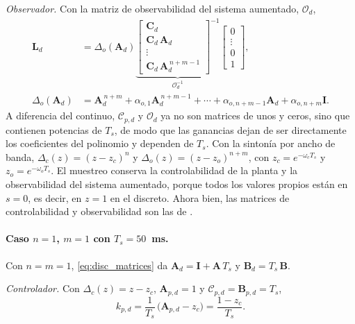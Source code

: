 \textit{Observador.} Con la matriz de observabilidad del sistema aumentado,
$\mathcal{O}_d$,
\begin{equation}
\begin{aligned}
\mathbf{L}_d &= \Delta_o(\mathbf{A}_d)
\underbrace{\begin{bmatrix}
\mathbf{C}_d \\ \mathbf{C}_d\,\mathbf{A}_d \\ \vdots \\ \mathbf{C}_d\,\mathbf{A}_d^{\,n+m-1}
\end{bmatrix}^{-1}}_{\mathcal{O}_d^{-1}}
\begin{bmatrix} 0 \\ \vdots \\ 0 \\ 1 \end{bmatrix},
\\
\Delta_o(\mathbf{A}_d) &= \mathbf{A}_d^{\,n+m} + \alpha_{o,1}\mathbf{A}_d^{\,n+m-1} + \cdots + \alpha_{o,n+m-1}\mathbf{A}_d + \alpha_{o,n+m}\mathbf{I} .
\end{aligned}
\label{eq:disc_ackermann_L}
\end{equation}
A diferencia del continuo, $\mathcal{C}_{p,d}$ y $\mathcal{O}_d$ ya no son
matrices de unos y ceros, sino que contienen potencias de $T_s$, de modo que las
ganancias dejan de ser directamente los coeficientes del polinomio y dependen
de $T_s$. Con la sintonía por ancho de banda,
$\Delta_c(z) = (z - z_c)^{n}$ y $\Delta_o(z) = (z - z_o)^{n+m}$, con
$z_c = e^{-\omega_c T_s}$ y $z_o = e^{-\omega_o T_s}$.
El muestreo conserva la controlabilidad de la planta y la observabilidad del
sistema aumentado, porque todos los valores propios están en $s = 0$, es decir, en $z = 1$ en el discreto. Ahora bien, las matrices de controlabilidad y observabilidad
son las de \cite[sec.~12.6.1]{chen1993analog}.

\paragraph{Caso $n = 1$, $m = 1$ con $T_s = 50$~ms.} Con $n = m = 1$,
\eqref{eq:disc_matrices} da $\mathbf{A}_d = \mathbf{I} + \mathbf{A}\,T_s$ y
$\mathbf{B}_d = T_s\,\mathbf{B}$.

\textit{Controlador.} Con $\Delta_c(z) = z - z_c$, $\mathbf{A}_{p,d} = 1$ y
$\mathcal{C}_{p,d} = \mathbf{B}_{p,d} = T_s$,
\begin{equation}
k_{p,d} = \frac{1}{T_s}\,\bigl(\mathbf{A}_{p,d} - z_c\bigr) = \frac{1 - z_c}{T_s} .
\end{equation}

